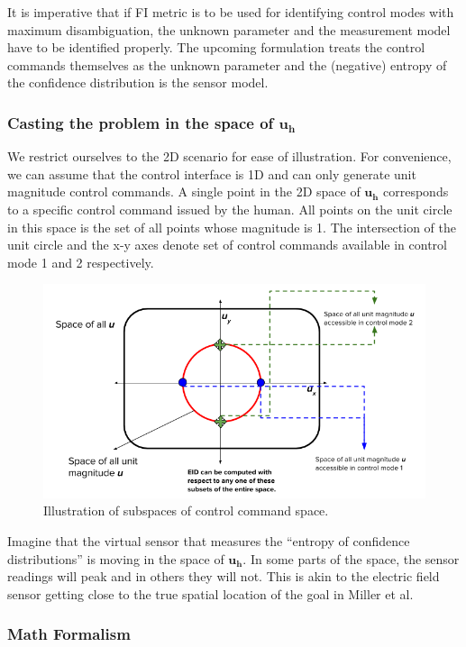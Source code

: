 \documentclass[]{article}
\begin{document}
It is imperative that if FI metric is to be used for identifying control modes with maximum disambiguation, the unknown parameter and the measurement model have to be identified properly. The upcoming formulation treats the control commands themselves as the unknown parameter and the (negative) entropy of the confidence distribution is the sensor model. 

\subsubsection*{Casting the problem in the space of $\boldsymbol{u_h}$}

We restrict ourselves to the 2D scenario for ease of illustration. For convenience, we can assume that the control interface is 1D and can only generate unit magnitude control commands. A single point in the 2D space of $\boldsymbol{u_h}$ corresponds to a specific control command issued by the human. All points on the unit circle in this space is the set of all points whose magnitude is 1. The intersection of the unit circle and the x-y axes denote set of control commands available in control mode 1 and 2 respectively. 
\begin{figure}[h]
		\centering
	\includegraphics[width = 0.7\hsize, height = 0.26\vsize]{./figures/UH_SPACE.png}
	\vspace{-0.4cm}
	\caption{Illustration of subspaces of control command space.}
	\label{DM_FIG}
\end{figure}

Imagine that the virtual sensor that measures the ``entropy of confidence distributions'' is moving in the space of $\boldsymbol{u_h}$. 
In some parts of the space, the sensor readings will peak and in others they will not. This is akin to the electric field sensor getting close to the true spatial location of the goal in Miller et al. 

\subsubsection*{Math Formalism}
\end{document}
